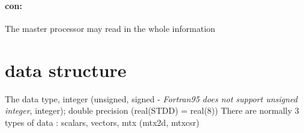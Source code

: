 \paragraph{con:} The master processor may read in the whole information
\section{data structure}
The data type, 	integer (unsigned, signed - \emph{Fortran95 does not support unsigned integer}, integer);
				double precision (real(STDD) = real(8))
There are normally 3 types of data :
									scalars, vectors, mtx (mtx2d, mtxcsr)

